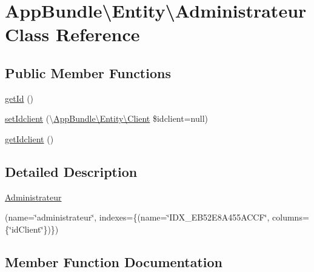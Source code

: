 \hypertarget{class_app_bundle_1_1_entity_1_1_administrateur}{}\section{App\+Bundle\textbackslash{}Entity\textbackslash{}Administrateur Class Reference}
\label{class_app_bundle_1_1_entity_1_1_administrateur}
\subsection*{Public Member Functions}
\begin{DoxyCompactItemize}
\item 
\hyperlink{class_app_bundle_1_1_entity_1_1_administrateur_aaf9ea0e33ba791243c7c16603af2c210}{get\+Id} ()
\item 
\hyperlink{class_app_bundle_1_1_entity_1_1_administrateur_a52af0e02de0a95232742d559fa184eac}{set\+Idclient} (\textbackslash{}\hyperlink{class_app_bundle_1_1_entity_1_1_client}{App\+Bundle\textbackslash{}\+Entity\textbackslash{}\+Client} \$idclient=null)
\item 
\hyperlink{class_app_bundle_1_1_entity_1_1_administrateur_a88cc351a097727b251efa8d181bf9d5a}{get\+Idclient} ()
\end{DoxyCompactItemize}


\subsection{Detailed Description}
\hyperlink{class_app_bundle_1_1_entity_1_1_administrateur}{Administrateur}

(name=\char`\"{}administrateur\char`\"{}, indexes=\{(name=\char`\"{}\+I\+D\+X\+\_\+E\+B52\+E8\+A455\+A\+C\+C\+F\char`\"{}, columns=\{\char`\"{}id\+Client\char`\"{}\})\})  

\subsection{Member Function Documentation}
\mbox{\label{class_app_bundle_1_1_entity_1_1_administrateur_aaf9ea0e33ba791243c7c16603af2c210}} 
